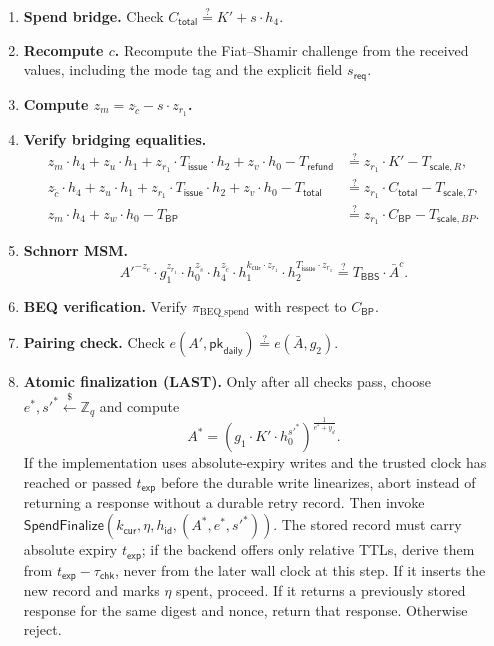 \documentclass[11pt]{article}
\theoremstyle{definitionstyle}
\theoremstyle{plain}
\begin{document}
\begin{enumerate}[leftmargin=*]
\item \textbf{Spend bridge.} Check $C_{\mathsf{total}} \stackrel{?}{=} K' + s \cdot h_4$.
\item \textbf{Recompute $c$.} Recompute the Fiat--Shamir challenge from the received values, including the mode tag and the explicit field $s_{\mathsf{req}}$.
\item \textbf{Compute $z_m = z_{\tilde{c}} - s \cdot z_{r_1}$.}
\item \textbf{Verify bridging equalities.}
  \begin{align*}
    z_m \cdot h_4 + z_u \cdot h_1 + z_{r_1} \cdot T_{\mathsf{issue}} \cdot h_2 + z_v \cdot h_0 - T_{\mathsf{refund}} &\stackrel{?}{=} z_{r_1} \cdot K' - T_{\mathsf{scale},R}, \\
    z_{\tilde{c}} \cdot h_4 + z_u \cdot h_1 + z_{r_1} \cdot T_{\mathsf{issue}} \cdot h_2 + z_v \cdot h_0 - T_{\mathsf{total}} &\stackrel{?}{=} z_{r_1} \cdot C_{\mathsf{total}} - T_{\mathsf{scale},T}, \\
    z_m \cdot h_4 + z_w \cdot h_0 - T_{\mathsf{BP}} &\stackrel{?}{=} z_{r_1} \cdot C_{\mathsf{BP}} - T_{\mathsf{scale},BP}.
  \end{align*}
\item \textbf{Schnorr MSM.}
  \[
  A'^{-z_e} \cdot g_1^{z_{r_1}} \cdot h_0^{z_{\tilde{s}}} \cdot h_4^{z_{\tilde{c}}} \cdot h_1^{k_{\mathsf{cur}} \cdot z_{r_1}} \cdot h_2^{T_{\mathsf{issue}} \cdot z_{r_1}} \stackrel{?}{=} T_{\mathsf{BBS}} \cdot \bar{A}^c.
  \]
\item \textbf{BEQ verification.} Verify $\pi_{\text{BEQ\_spend}}$ with respect to $C_{\mathsf{BP}}$.
\item \textbf{Pairing check.} Check $e(A', \mathsf{pk}_{\mathsf{daily}}) \stackrel{?}{=} e(\bar{A}, g_2)$.
\item \textbf{Atomic finalization (LAST).} Only after all checks pass, choose $e^*, s'^* \xleftarrow{\$} \mathbb{Z}_q$ and compute
  \[
  A^* = \left( g_1 \cdot K' \cdot h_0^{s'^*} \right)^{\frac{1}{e^* + y_d}}.
  \]
  If the implementation uses absolute-expiry writes and the trusted clock has reached or passed $t_{\mathsf{exp}}$ before the durable write linearizes, abort instead of returning a response without a durable retry record. Then invoke $\mathsf{SpendFinalize}(k_{\mathsf{cur}}, \eta, h_{\mathsf{id}}, (A^*, e^*, s'^*))$. The stored record must carry absolute expiry $t_{\mathsf{exp}}$; if the backend offers only relative TTLs, derive them from $t_{\mathsf{exp}}-\tau_{\mathsf{chk}}$, never from the later wall clock at this step. If it inserts the new record and marks $\eta$ spent, proceed. If it returns a previously stored response for the same digest and nonce, return that response. Otherwise reject.
\end{enumerate}
\end{document}

